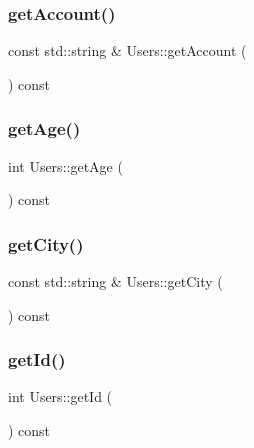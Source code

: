 \mbox{\label{class_users_ac7de9540bae619943ddd748118d8655e}} 
\subsubsection{\texorpdfstring{get\+Account()}{getAccount()}}
{\footnotesize\ttfamily const std\+::string \& Users\+::get\+Account (\begin{DoxyParamCaption}{ }\end{DoxyParamCaption}) const}

\mbox{\label{class_users_a36956c95deb02797b556c6f04310cb27}} 
\subsubsection{\texorpdfstring{get\+Age()}{getAge()}}
{\footnotesize\ttfamily int Users\+::get\+Age (\begin{DoxyParamCaption}{ }\end{DoxyParamCaption}) const}

\mbox{\label{class_users_a7445786d7c4278d1d3438381fe666f85}} 
\subsubsection{\texorpdfstring{get\+City()}{getCity()}}
{\footnotesize\ttfamily const std\+::string \& Users\+::get\+City (\begin{DoxyParamCaption}{ }\end{DoxyParamCaption}) const}

\mbox{\label{class_users_a73febb7bc50fffd0178cef2d24b71f57}} 
\subsubsection{\texorpdfstring{get\+Id()}{getId()}}
{\footnotesize\ttfamily int Users\+::get\+Id (\begin{DoxyParamCaption}{ }\end{DoxyParamCaption}) const}

